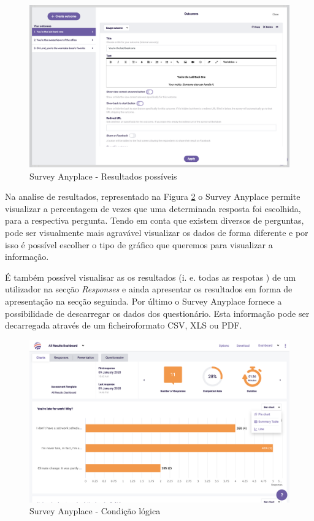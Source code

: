 \begin{figure}[ht!]
	\begin{center}
		\includegraphics[width=1\textwidth]{img/sap/outcome}
		\caption{Survey Anyplace - Resultados possíveis}
		\label{fig:sap-outcome}
	\end{center}
\end{figure}
\newpage

Na analise de resultados, representado na Figura \ref{fig:sap-results} o Survey Anyplace permite visualizar a percentagem de vezes que uma determinada resposta foi escolhida, para a respectiva pergunta. Tendo em conta que existem diversos de perguntas, pode ser visualmente mais agravável visualizar os dados de forma diferente e por isso é possível escolher o tipo de gráfico que queremos para visualizar a informação. 

É também possível visualisar as os resultados (i. e. todas as respotas ) de um utilizador na secção \textit{Responses} e ainda apresentar os resultados em forma de apresentação na secção seguinda. Por último o Survey Anyplace fornece a possibilidade de descarregar os dados dos questionário. Esta informação pode ser decarregada através de um ficheiroformato CSV, XLS ou PDF.

\newpage

\begin{figure}[ht!]
	\begin{center}
		\includegraphics[width=1\textwidth]{img/sap/results}
		\caption{Survey Anyplace - Condição lógica}
		\label{fig:sap-results}
	\end{center}
\end{figure}
